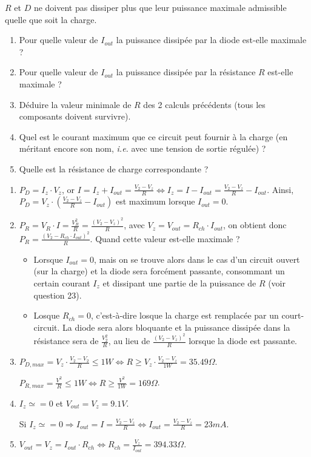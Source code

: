 \documentclass{../template/labo}
\begin{document}
\Question
{
	$R$ et $D$ ne doivent pas dissiper plus que leur puissance maximale admissible quelle que soit la charge. %
	\begin{enumerate}
	\item Pour quelle valeur de $I_{out}$ la puissance dissipée par la diode est-elle maximale ?
	\item Pour quelle valeur de $I_{out}$ la puissance dissipée par la résistance $R$ est-elle maximale ? 
	\item Déduire la valeur minimale de $R$ des 2 calculs précédents (tous les composants doivent survivre).
	\item Quel est le courant maximum que ce circuit peut fournir à la charge (en méritant encore son nom, \textit{i.e.} avec une tension de sortie régulée) ?
	\item Quelle est la résistance de charge correspondante ?
	\end{enumerate}
}
{
	\begin{enumerate}
	\item $P_D = I_z \cdot V_z$, or $I = I_z + I_{out} = \frac{V_2 - V_z}{R} \Leftrightarrow I_z = I - I_{out} = \frac{V_2 - V_z}{R} - I_{out}$.
	Ainsi, $P_D = V_z\cdot (\frac{V_2 - V_z}{R} - I_{out})$ est maximum lorsque $I_{out} = 0$.
	\item $P_R = V_R \cdot I = \frac{V_R^2}{R} = \frac{(V_2 - V_z)^2}{R}$, avec $V_z = V_{out} = R_{ch} \cdot I_{out}$, on obtient donc $P_R = \frac{(V_2 - R_{ch} \cdot I_{out})^2}{R}$.
	Quand cette valeur est-elle maximale ?
	\begin{itemize}
		\item Lorsque $I_{out} = 0$, mais on se trouve alors dans le cas d'un circuit ouvert (sur la charge) et la diode sera forcément passante, consommant un certain courant $I_z$ et dissipant une partie de la puissance de $R$ (voir question 23).
		\item Losque $R_{ch} = 0$, c'est-à-dire losque la charge est remplacée par un court-circuit.
		La diode sera alors bloquante et la puissance dissipée dans la résistance sera de $\frac{V_2^2}{R}$, au lieu de $\frac{(V_2 - V_z)^2}{R}$ lorsque la diode est passante.
	\end{itemize}
	\item $P_{D, max} = V_z \cdot \frac{V_2 - V_2}{R} \leq 1W \Leftrightarrow R \geq V_z \cdot \frac{V_2 - V_z}{1 W} = 35.49 \Omega$.

	$P_{R, max} = \frac{V^2}{R} \leq 1W \Leftrightarrow R \geq \frac{V^2}{1W} = 169 \Omega$.
	\item $I_z \simeq = 0$ et $V_{out} = V_z = 9.1 V$.

	Si $I_z \simeq = 0 \Rightarrow I_{out} = I = \frac{V_2 - V_z}{R} \Leftrightarrow I_{out} = \frac{V_2 - V_z}{R} = 23mA$.
	\item $V_{out} = V_z = I_{out} \cdot R_{ch} \Leftrightarrow R_{ch} = \frac{V_z}{I_{out}} = 394.33 \Omega$.
	\end{enumerate}
}%
	\label{Q:23}
\end{document}
